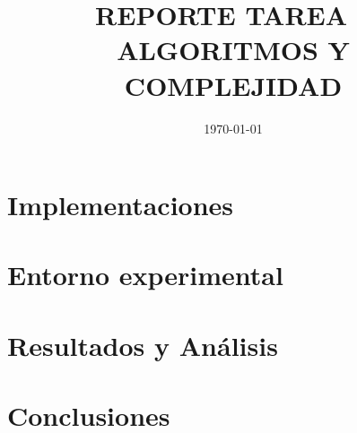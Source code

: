 \documentclass[11pt,spanish]{article} %
\author{\namestudent}
\title{
  \huge
  \textbf{REPORTE TAREA \tnum~ \\ ALGORITMOS Y COMPLEJIDAD} \\[1ex]
  \emph{\textquote{¿Quién ganará? Greedys vs Dinámico vs Bruto.}}
  }
\date{
  \small
  \today\\
  \currenttime
}
\begin{document}
\maketitle
\thispagestyle{fancy}
\vspace{-1.0\baselineskip}

\section{Implementaciones}


\section{Entorno experimental}


\section{Resultados y Análisis}


\section{Conclusiones}


\printbibliography
\end{document}
